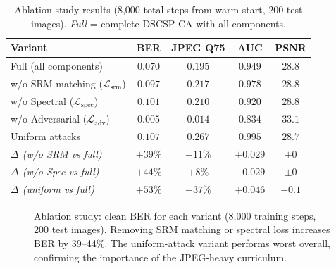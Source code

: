 \documentclass[journal]{IEEEtran}
\newcommand{\Lcal}{\mathcal{L}}
\begin{document}
\begin{table}[t]
\centering
\caption{Ablation study results (8{,}000 total steps from warm-start, 200 test images).
         \emph{Full} = complete DSCSP-CA with all components.}
\label{tab:ablation}
\small
\begin{tabular}{@{}lcccc@{}}
\toprule
\textbf{Variant} & \textbf{BER} & \textbf{JPEG Q75} & \textbf{AUC} & \textbf{PSNR} \\
\midrule
Full (all components)     & $0.070$ & $0.195$ & $0.949$ & $28.8$ \\
w/o SRM matching ($\Lcal_\text{srm}$)
                          & $0.097$ & $0.217$ & $0.978$ & $28.8$ \\
w/o Spectral ($\Lcal_\text{spec}$)
                          & $0.101$ & $0.210$ & $0.920$ & $28.8$ \\
w/o Adversarial ($\Lcal_\text{adv}$)
                          & $0.005$ & $\mathbf{0.014}$ & $0.834$ & $33.1$ \\
Uniform attacks           & $0.107$ & $0.267$ & $0.995$ & $28.7$ \\
\midrule
\textit{$\Delta$ (w/o SRM vs full)}
                          & $+39\%$ & $+11\%$ & $+0.029$ & $\pm0$ \\
\textit{$\Delta$ (w/o Spec vs full)}
                          & $+44\%$ & $+8\%$  & $-0.029$ & $\pm0$ \\
\textit{$\Delta$ (uniform vs full)}
                          & $+53\%$ & $+37\%$ & $+0.046$ & $-0.1$ \\
\bottomrule
\end{tabular}
\end{table}

\begin{figure}[t]
\centering
{}
\caption{Ablation study: clean BER for each variant (8{,}000 training steps, 200 test images).
         Removing SRM matching or spectral loss increases BER by 39--44\%.
         The uniform-attack variant performs worst overall, confirming the importance of the
         JPEG-heavy curriculum.}
\label{fig:ablation_chart}
\end{figure}
\end{document}
